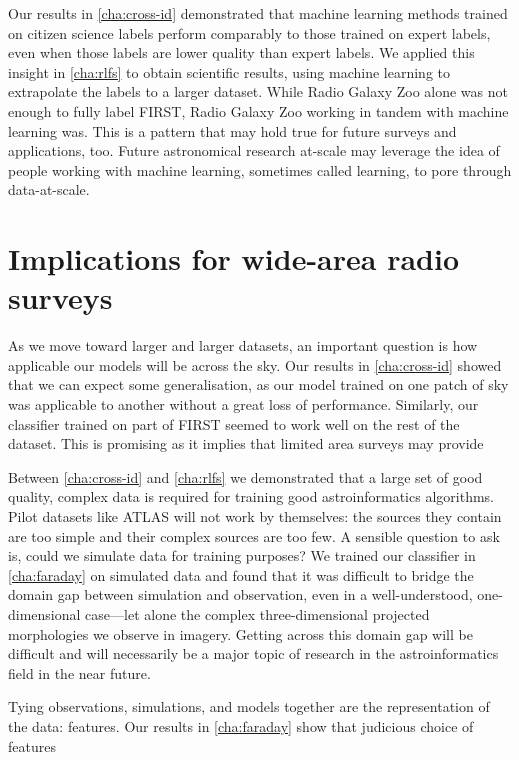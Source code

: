     Our results in \autoref{cha:cross-id} demonstrated that machine learning methods trained on citizen science labels perform comparably to those trained on expert labels, even when those labels are lower quality than expert labels. We applied this insight in \autoref{cha:rlfs} to obtain scientific results, using machine learning to extrapolate the labels to a larger dataset. While Radio Galaxy Zoo alone was not enough to fully label FIRST, Radio Galaxy Zoo working in tandem with machine learning was. This is a pattern that may hold true for future surveys and applications, too. Future astronomical research at-scale may leverage the idea of people working with machine learning, sometimes called  \citep[e.g.][]{holzinger_interactive_2016} learning, to pore through data-at-scale.

\section{Implications for wide-area radio surveys}
\label{sec:implications-wide-area-radio-surveys}

    As we move toward larger and larger datasets, an important question is how applicable our models will be across the sky. Our results in \autoref{cha:cross-id} showed that we can expect some generalisation, as our model trained on one patch of sky was applicable to another without a great loss of performance. Similarly, our classifier trained on part of FIRST seemed to work well on the rest of the dataset. This is promising as it implies that limited area surveys may provide 

    Between \autoref{cha:cross-id} and \autoref{cha:rlfs} we demonstrated that a large set of good quality, complex data is required for training good astroinformatics algorithms. Pilot datasets like ATLAS will not work by themselves: the sources they contain are too simple and their complex sources are too few. A sensible question to ask is, could we simulate data for training purposes? We trained our classifier in \autoref{cha:faraday} on simulated data and found that it was difficult to bridge the domain gap between simulation and observation, even in a well-understood, one-dimensional case---let alone the complex three-dimensional projected morphologies we observe in imagery. Getting across this domain gap will be difficult and will necessarily be a major topic of research in the astroinformatics field in the near future.

    Tying observations, simulations, and models together are the representation of the data: features. Our results in \autoref{cha:faraday} show that judicious choice of features 

